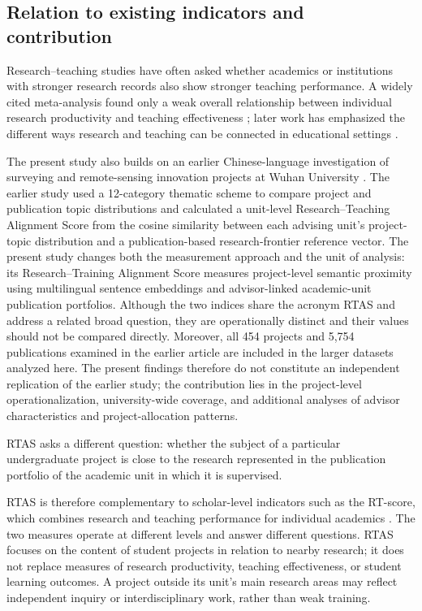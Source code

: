 \documentclass[pdflatex,sn-apa]{sn-jnl}
\begin{document}
\subsection{Relation to existing indicators and contribution}

Research--teaching studies have often asked whether academics or institutions with stronger research records also show stronger teaching performance. A widely cited meta-analysis found only a weak overall relationship between individual research productivity and teaching effectiveness \citep{hattie1996relationship}; later work has emphasized the different ways research and teaching can be connected in educational settings \citep{healey2005linking,brew2003teaching}.

The present study also builds on an earlier Chinese-language investigation of surveying and remote-sensing innovation projects at Wuhan University \citep{tian2026surveying}. The earlier study used a 12-category thematic scheme to compare project and publication topic distributions and calculated a unit-level Research--Teaching Alignment Score from the cosine similarity between each advising unit's project-topic distribution and a publication-based research-frontier reference vector. The present study changes both the measurement approach and the unit of analysis: its Research--Training Alignment Score measures project-level semantic proximity using multilingual sentence embeddings and advisor-linked academic-unit publication portfolios. Although the two indices share the acronym RTAS and address a related broad question, they are operationally distinct and their values should not be compared directly. Moreover, all 454 projects and 5,754 publications examined in the earlier article are included in the larger datasets analyzed here. The present findings therefore do not constitute an independent replication of the earlier study; the contribution lies in the project-level operationalization, university-wide coverage, and additional analyses of advisor characteristics and project-allocation patterns.

RTAS asks a different question: whether the subject of a particular undergraduate project is close to the research represented in the publication portfolio of the academic unit in which it is supervised.

RTAS is therefore complementary to scholar-level indicators such as the RT-score, which combines research and teaching performance for individual academics \citep{scafetta2025rt}. The two measures operate at different levels and answer different questions. RTAS focuses on the content of student projects in relation to nearby research; it does not replace measures of research productivity, teaching effectiveness, or student learning outcomes. A project outside its unit's main research areas may reflect independent inquiry or interdisciplinary work, rather than weak training.
\end{document}
